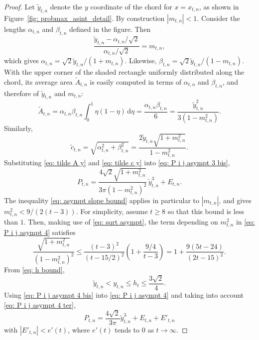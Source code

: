 \documentclass[12pt, a4paper]{article}
\newcommand{\diff}{\mathrm d}
\newcommand{\tiles}{t} %
\newcommand{\lra}{\alpha}
\newcommand{\lrb}{\beta}
\begin{document}
\begin{proof}
Let $\tilde y_{\tiles,n}$ denote the $y$ coordinate of the chord for $x = x_{\tiles,n}$, as shown in Figure~\ref{fig: probmax_asint_detail}. By construction $|m_{\tiles,n}|<1$. Consider the lengths $\lra_{\tiles,n}$ and $\lrb_{\tiles,n}$ defined in the figure. Then
\begin{equation}
\frac{\tilde y_{\tiles,n}-\lra_{\tiles,n}/\sqrt{2}}{\lra_{\tiles,n}/\sqrt{2}} = m_{\tiles,n},
\end{equation}
which gives $\lra_{\tiles,n} = \sqrt{2}\tilde y_{\tiles,n}/(1+m_{\tiles,n})$. Likewise, $\lrb_{\tiles,n} = \sqrt{2}\tilde y_{\tiles,n}/(1-m_{\tiles,n})$. With the upper corner of the shaded rectangle uniformly distributed along the chord, its average area $\tilde A_{\tiles,n}$ is easily computed in terms of $\lra_{\tiles,n}$ and $\lrb_{\tiles,n}$, and therefore of $\tilde y_{\tiles,n}$ and $m_{\tiles,n}$:
\begin{equation}
\label{eq: tilde A y}
\tilde A_{\tiles,n} = \lra_{\tiles,n}\lrb_{\tiles,n} \int_0^1 \eta(1-\eta)\, \diff \eta = \frac{\lra_{\tiles,n}\lrb_{\tiles,n}} 6 = \frac{\tilde y_{\tiles,n}^2}{3(1-m_{\tiles,n}^2)}.
\end{equation}
Similarly,
\begin{equation}
\label{eq: tilde c y}
\tilde c_{\tiles,n} = \sqrt{\lra_{\tiles,n}^2+\lrb_{\tiles,n}^2} = \frac {2 \tilde y_{\tiles,n} \sqrt{1+m_{\tiles,n}^2}} {1-m_{\tiles,n}^2}.
\end{equation}
Substituting \eqref{eq: tilde A y} and \eqref{eq: tilde c y} into \eqref{eq: P i j asympt 3 bis},
\begin{equation}
\label{eq: P i j asympt 4}
P_{\tiles,n}
= \frac{4\sqrt{2} \sqrt{1+m_{\tiles,n}^2}} {3\pi(1-m_{\tiles,n}^2)^2}\, \tilde y_{\tiles,n}^3 + E_{\tiles, n}.
\end{equation}
The inequality \eqref{eq: asympt slope bound} applies in particular to $|m_{\tiles,n}|$, and gives $m_{\tiles,n}^2 < 9/(2(\tiles-3))$. For simplicity, assume $\tiles \geq 8$ so that this bound is less than $1$. Then, making use of \eqref{eq: sqrt asympt}, the term depending on $m_{\tiles,n}^2$ in \eqref{eq: P i j asympt 4} satisfies
\begin{equation}
\label{eq: P i j asympt 4 bis}
\frac{\sqrt{1+m_{\tiles, n}^2}} {(1-m_{\tiles, n}^2)^2} \leq \frac{(\tiles-3)^2}{(\tiles-15/2)^2} \left(1+\frac {9/4} {\tiles-3}\right) = 1 + \frac{9(5\tiles - 24)}{(2\tiles-15)^2}.
\end{equation}
From \eqref{eq: h bound},
\begin{equation}
\label{eq: P i j asympt 4 ter}
\tilde y_{\tiles,n} < y_{\tiles,n} \leq h_\tiles \leq \frac{3\sqrt{2}} 4.
\end{equation}
Using \eqref{eq: P i j asympt 4 bis} into \eqref{eq: P i j asympt 4} and taking into account \eqref{eq: P i j asympt 4 ter},
\begin{equation}
\label{eq: P i j asympt 5}
P_{\tiles,n} = \frac{4\sqrt{2}} {3\pi} \tilde y_{\tiles,n}^3 + E_{\tiles,n} + E'_{\tiles,n}
\end{equation}
with $|E'_{\tiles,n}| < e'(t)$, where $e'(t)$ tends to $0$ as $t \rightarrow \infty$.


\end{proof}
\end{document}
